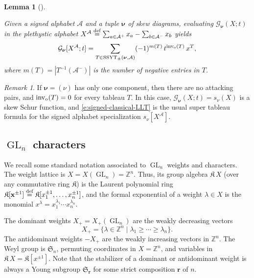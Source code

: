 \documentclass[12pt]{amsart}
\newtheorem{lemma}[thm]{Lemma}
\theoremstyle{definition}
\theoremstyle{remark}
\newtheorem{remark}[thm]{Remark}
\newcommand{\ZZ}{{\mathbb Z}}
\newcommand{\rr}{{\mathbf r}}
\newcommand{\xx}{{\mathbf x}}
\newcommand{\nubold}{{\boldsymbol \nu }}
\newcommand{\Kfrak}{{\mathfrak K}}
\newcommand{\Sfrak}{{\mathfrak S}}
\newcommand{\Acal}{{\mathcal A}}
\newcommand{\Gcal}{{\mathcal G}}
\DeclareMathOperator{\inv}{inv}
\newcommand{\oinv}{\inv _{{\rm o}}}
\DeclareMathOperator{\GL}{GL}
\DeclareMathOperator{\SSYT}{SSYT}
\newcommand{\defeq}{\mathrel{\overset{\text{{\rm def}}}{=}}}
\begin{document}
\begin{lemma}[{\cite[(81)--(82) and Proposition 4.2]{HagHaiLo05}}]
\label{lem:signed-classical-LLT}

Given a signed alphabet $\Acal $ and a tuple $\nubold $ of skew
diagrams, evaluating $\Gcal _{\nubold }(X;t)$ in the plethystic
alphabet $X^{\Acal } \defeq \sum _{a\in \Acal ^{+}} x_{a} - \sum
_{b\in \Acal ^{-}} x_b$ yields
\begin{equation}\label{e:signed-classical-LLT}
\Gcal _{\nubold }[X^{\Acal };t] = \sum _{T\in \SSYT _{\pm }(\nubold
,\Acal )} (-1)^{m(T)}\, t^{\oinv (T)}\, x^{T},
\end{equation}
where $m(T)=|T^{-1}(\Acal ^{-})|$ is the number of negative entries in
$T$.
\end{lemma}

\begin{remark}\label{rem:super-skew-schur}
If $\nubold = (\nu )$ has only one component, then there are no
attacking pairs, and $\oinv (T) = 0$ for every tableau $T$.  In this
case, $\Gcal _{\nubold }(X; t) = s_{\nu}(X)$ is a skew Schur function,
and \eqref{e:signed-classical-LLT} is the usual super tableau formula
for the signed alphabet specialization $s_{\nu }[X^{\Acal }]$.
\end{remark}



\subsection{\texorpdfstring{$\GL _{n}$}{GL\_n} characters}
\label{ss:GLn-characters}

We recall some standard notation associated to  $\GL_n$ weights and characters.
The weight lattice is $X = X(\GL_n) =  \ZZ ^{n}$.  Thus, its group
algebra $\Kfrak \, X$ (over any commutative ring $\Kfrak $) is the
Laurent polynomial ring $\Kfrak [\xx ^{\pm 1}] \defeq \Kfrak
[x_{1}^{\pm 1},\ldots,x_{n}^{\pm 1}]$, and the formal exponential of a
weight $\lambda \in X$ is the monomial $x ^{\lambda } = x_{1}^{\lambda
_{1}}\cdots x_{n}^{\lambda _{n}}$.

The dominant weights $X_{+} = X_+(\GL_n)$ are the weakly
decreasing vectors
\begin{equation}\label{e:X+}
X_{+} = \{\lambda \in \ZZ ^{n}\mid \lambda _{1}\geq
\cdots \geq \lambda _{n} \}.
\end{equation}
The antidominant weights $-X_+$ are the weakly increasing vectors in  $\ZZ^n$.
The Weyl group is $\Sfrak _{n}$, permuting coordinates in $X= \ZZ
^{n}$, and variables in $\Kfrak \, X = \Kfrak [x ^{\pm 1}]$.
Note that the stabilizer of a dominant or antidominant weight is always a Young subgroup
$\Sfrak_{\rr}$ for some strict composition $\rr $ of $n$.
\end{document}
